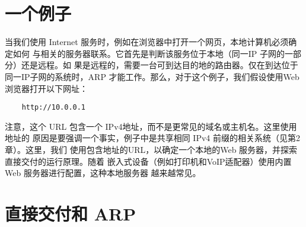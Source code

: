 \section{一个例子}

当我们使用 Internet 服务时，例如在浏览器中打开一个网页，本地计算机必须确定如何
与相关的服务器联系。它首先是判断该服务位于本地（同一IP 子网的一部分）还是远程。如
果是远程的，需要一台可到达目的地的路由器。仅在到达位于同一IP子网的系统时，ARP
才能工作。那么，对于这个例子，我们假设使用Web 浏览器打开以下网址：

\begin{verbatim}
    http://10.0.0.1
\end{verbatim}

注意，这个 URL 包含一个 IPv4地址，而不是更常见的域名或主机名。这里使用地址的
原因是要强调一个事实，例子中是共享相同 IPv4 前缀的相关系统（见第2章）。这里，我们
使用包含地址的URL，以确定一个本地的Web 服务器，并探索直接交付的运行原理。随着
嵌入式设备（例如打印机和VoIP适配器）使用内置Web 服务器进行配置，这种本地服务器
越来越常见。

\section{直接交付和 ARP}

